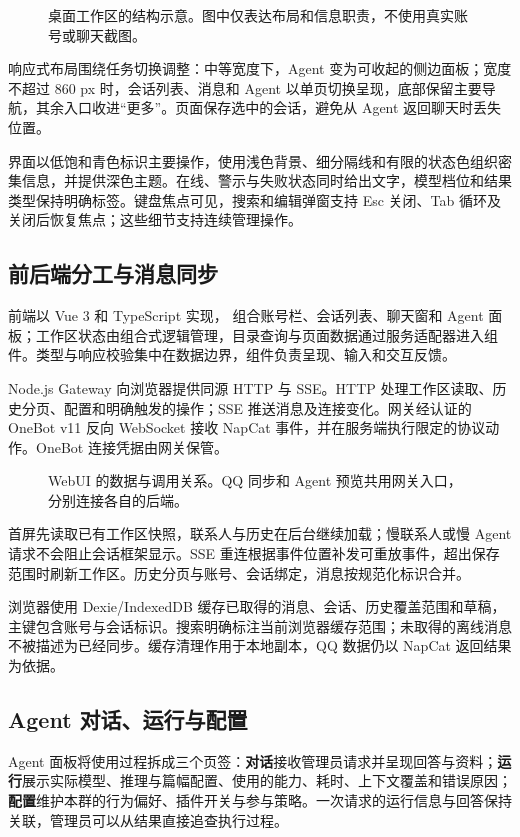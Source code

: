 \begin{figure}[H]\centering

\caption{桌面工作区的结构示意。图中仅表达布局和信息职责，不使用真实账号或聊天截图。}
\label{fig:webui-layout}
\end{figure}

响应式布局围绕任务切换调整：中等宽度下，Agent 变为可收起的侧边面板；宽度不超过 860 px 时，会话列表、消息和 Agent 以单页切换呈现，底部保留主要导航，其余入口收进“更多”。页面保存选中的会话，避免从 Agent 返回聊天时丢失位置。

界面以低饱和青色标识主要操作，使用浅色背景、细分隔线和有限的状态色组织密集信息，并提供深色主题。在线、警示与失败状态同时给出文字，模型档位和结果类型保持明确标签。键盘焦点可见，搜索和编辑弹窗支持 Esc 关闭、Tab 循环及关闭后恢复焦点；这些细节支持连续管理操作。

\subsection{前后端分工与消息同步}
前端以 Vue 3 和 TypeScript 实现， 组合账号栏、会话列表、聊天窗和 Agent 面板；工作区状态由组合式逻辑管理，目录查询与页面数据通过服务适配器进入组件。类型与响应校验集中在数据边界，组件负责呈现、输入和交互反馈。

Node.js Gateway 向浏览器提供同源 HTTP 与 SSE。HTTP 处理工作区读取、历史分页、配置和明确触发的操作；SSE 推送消息及连接变化。网关经认证的 OneBot v11 反向 WebSocket 接收 NapCat 事件，并在服务端执行限定的协议动作。OneBot 连接凭据由网关保管。

\begin{figure}[H]\centering

\caption{WebUI 的数据与调用关系。QQ 同步和 Agent 预览共用网关入口，分别连接各自的后端。}
\label{fig:webui-architecture}
\end{figure}

首屏先读取已有工作区快照，联系人与历史在后台继续加载；慢联系人或慢 Agent 请求不会阻止会话框架显示。SSE 重连根据事件位置补发可重放事件，超出保存范围时刷新工作区。历史分页与账号、会话绑定，消息按规范化标识合并。

浏览器使用 Dexie/IndexedDB 缓存已取得的消息、会话、历史覆盖范围和草稿，主键包含账号与会话标识。搜索明确标注当前浏览器缓存范围；未取得的离线消息不被描述为已经同步。缓存清理作用于本地副本，QQ 数据仍以 NapCat 返回结果为依据。

\subsection{Agent 对话、运行与配置}
Agent 面板将使用过程拆成三个页签：\textbf{对话}接收管理员请求并呈现回答与资料；\textbf{运行}展示实际模型、推理与篇幅配置、使用的能力、耗时、上下文覆盖和错误原因；\textbf{配置}维护本群的行为偏好、插件开关与参与策略。一次请求的运行信息与回答保持关联，管理员可以从结果直接追查执行过程。

